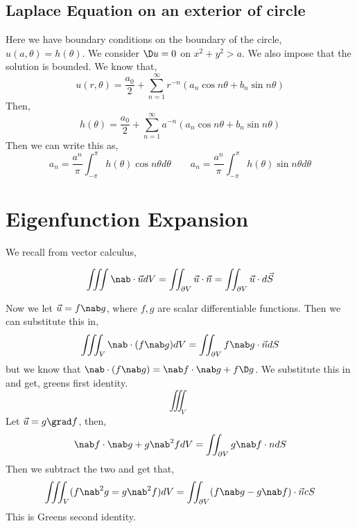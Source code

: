 \subsection{Laplace Equation on an exterior of circle}
Here we have boundary conditions on the boundary of the circle, $u(a, \theta) = h(\theta)$. We consider $\D u = 0$ on $x^2 + y^2 > a$. We also impose that the solution is bounded. We know that,
$$ u(r, \theta) = \frac{a_0}{2} + \sum_{n=1}^\infty r^{-n} \left( a_n\cos n \theta + b_n\sin n \theta\right) $$
Then,
$$ h(\theta) = \frac{a_0}{2} + \sum_{n=1}^\infty a^{-n} \left( a_n\cos n \theta + b_n\sin n \theta \right) $$
Then we can write this as,
$$ a_n = \frac{a^n}{\pi}\int_{-\pi}^\pi h(\theta)\cos n \theta d \theta \qquad a_n = \frac{a^n}{\pi}\int_{-\pi}^\pi h(\theta)\sin n \theta d \theta $$

\section{Eigenfunction Expansion}
We recall from vector calculus,
\begin{ndefi}
  $$ \iiint \nab \cdot \vec u dV = \iint_{\partial V} \vec u \cdot \vec n = \iint_{\partial V} \vec u \cdot d\vec S $$
\end{ndefi}
Now we let $\vec u = f\nab g$, where $f, g$ are scalar differentiable functions. Then we can substitute this in,
$$ \iiint_{V} \nab \cdot (f\nab g) dV = \iint_{\partial V} f \nab g \cdot \vec n dS $$
but we know that $\nab \cdot (f \nab g) = \nab f \cdot \nab g + f\D g$. We substitute this in and get, greens first identity.
$$ \iiint_V  $$
Let $\vec u = g \grad f$, then,
$$ \nab f \cdot \nab g + g\nab^2 f dV  = \iint_{\partial V} g\nab f \cdot n dS $$
Then we subtract the two and get that,
$$ \iiint_V (f\nab^2 g = g\nab^2 f) dV = \iint_{\partial V} (f \nab g - g \nab f)\cdot \vec n cS $$
This is Greens second identity.